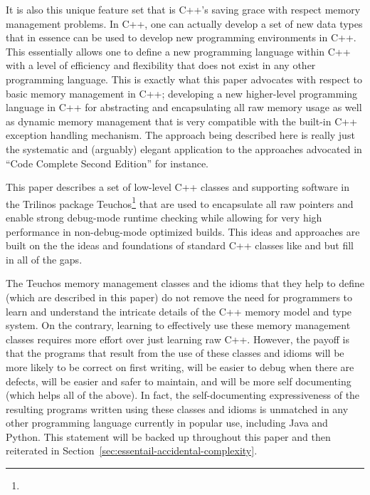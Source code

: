\documentclass[pdf,ps2pdf,11pt]{SANDreport}
\begin{document}
It is also this unique feature set that is C++'s saving grace with
respect memory management problems.  In C++, one can actually develop
a set of new data types that in essence can be used to develop new
programming environments in C++.  This essentially allows one to
define a new programming language within C++ with a level of
efficiency and flexibility that does not exist in any other
programming language.  This is exactly what this paper advocates with
respect to basic memory management in C++; developing a new
higher-level programming language in C++ for abstracting and
encapsulating all raw memory usage as well as dynamic memory
management that is very compatible with the built-in C++ exception
handling mechanism.  The approach being described here is really just
the systematic and (arguably) elegant application to the approaches
advocated in ``Code Complete Second Edition'' {}\cite[Section 13.2:
Pointers]{CodeComplete2nd04} for instance.

This paper describes a set of low-level C++ classes and supporting
software in the Trilinos package
Teuchos\footnote{}
that are used to encapsulate all raw pointers and enable strong
debug-mode runtime checking while allowing for very high performance
in non-debug-mode optimized builds.  This ideas and approaches are
built on the the ideas and foundations of standard C++ classes like
{} and {} but fill in all of
the gaps.

The Teuchos memory management classes and the idioms that they help to
define (which are described in this paper) do not remove the need for
programmers to learn and understand the intricate details of the C++
memory model and type system.  On the contrary, learning to
effectively use these memory management classes requires more effort
over just learning raw C++.  However, the payoff is that the programs
that result from the use of these classes and idioms will be more
likely to be correct on first writing, will be easier to debug when
there are defects, will be easier and safer to maintain, and will be
more self documenting (which helps all of the above).  In fact, the
self-documenting expressiveness of the resulting programs written
using these classes and idioms is unmatched in any other programming
language currently in popular use, including Java and Python.  This
statement will be backed up throughout this paper and then reiterated
in Section~\ref{sec:essentail-accidental-complexity}.
\end{document}
